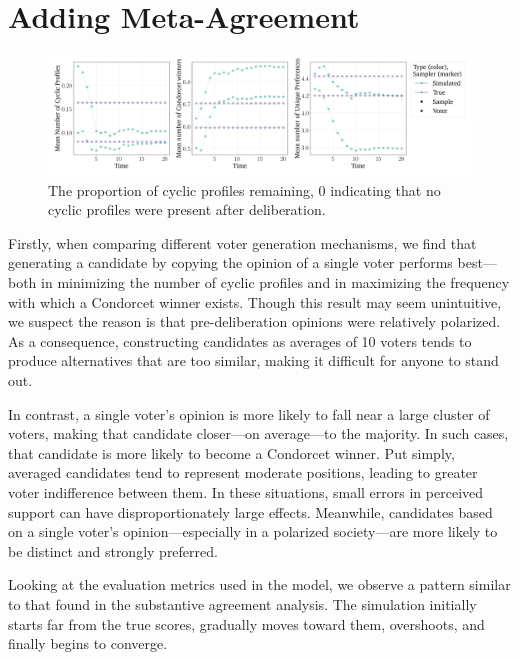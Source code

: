 \section{Adding Meta-Agreement}

\begin{figure}[htbp]
	\centering
	\centering
	\includegraphics[width=\textwidth]{Figures/three_measures.png
	}
	\caption{The proportion of cyclic profiles remaining, 0 indicating that no cyclic profiles were present after deliberation.}
	\label{fig:degroot_cyclic}
\end{figure}

Firstly, when comparing different voter generation mechanisms, we find that generating a candidate by copying the opinion of a single voter performs best—both in minimizing the number of cyclic profiles and in maximizing the frequency with which a Condorcet winner exists. Though this result may seem unintuitive, we suspect the reason is that pre-deliberation opinions were relatively polarized. As a consequence, constructing candidates as averages of 10 voters tends to produce alternatives that are too similar, making it difficult for anyone to stand out.

In contrast, a single voter's opinion is more likely to fall near a large cluster of voters, making that candidate closer—on average—to the majority. In such cases, that candidate is more likely to become a Condorcet winner. Put simply, averaged candidates tend to represent moderate positions, leading to greater voter indifference between them. In these situations, small errors in perceived support can have disproportionately large effects. Meanwhile, candidates based on a single voter's opinion—especially in a polarized society—are more likely to be distinct and strongly preferred.

Looking at the evaluation metrics used in the model, we observe a pattern similar to that found in the substantive agreement analysis. The simulation initially starts far from the true scores, gradually moves toward them, overshoots, and finally begins to converge.

